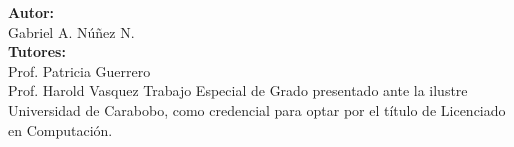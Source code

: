 \begin{titlepage}
	\begin{center}
	\membrete
	\vfill
	\textbf{Autor:}\\
	Gabriel A. N\'{u}\~{n}ez N.\\
	\vfill
	\textbf{Tutores:} \\
	Prof. Patricia Guerrero \\
	Prof. Harold Vasquez
	\vfill
	Trabajo Especial de Grado presentado ante la ilustre Universidad de Carabobo, como credencial para optar por el t\'{i}tulo de Licenciado en Computaci\'{o}n.
	\vfill
	\fecha
	\end{center}
\end{titlepage}